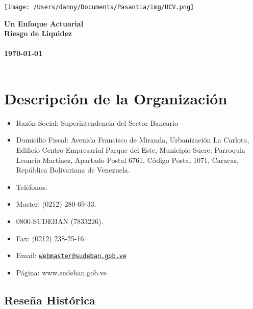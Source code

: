 \documentclass[]{article}
\title{}
\author{}
\date{}
\begin{document}
\begin{titlepage}
\pagecolor{gray40}
\noindent
\texttt{[image: /Users/danny/Documents/Pasantia/img/UCV.png]}\\[-1em]
\color{white}
\makebox[0pt][l]{\rule{1.3\textwidth}{1pt}}
\par
\noindent
\textbf{\textsf{Un Enfoque Actuarial}}\\
\Huge\textbf{Riesgo de Liquidez} \\ \\
\vfill
\noindent
\small{\textbf{\today}} \\ \\
\end{titlepage}
\restoregeometry %
\nopagecolor%

\tableofcontents

\hypertarget{descripcion-de-la-organizacion}{%
\section{Descripción de la
Organización}\label{descripcion-de-la-organizacion}}

\begin{itemize}
\item
  Razón Social: Superintendencia del Sector Bancario
\item
  Domicilio Fiscal: Avenida Francisco de Miranda, Urbanización La
  Carlota, Edificio Centro Empresarial Parque del Este, Municipio Sucre,
  Parroquia Leoncio Martínez, Apartado Postal 6761, Código Postal 1071,
  Caracas, República Bolivariana de Venezuela.
\item
  Teléfonos:
\item
  Master: (0212) 280-69-33.
\item
  0800-SUDEBAN (7833226).
\item
  Fax: (0212) 238-25-16.
\item
  Email:
  \href{mailto:webmaster@sudeban.gob.ve}{\nolinkurl{webmaster@sudeban.gob.ve}}
\item
  Página: www.sudeban.gob.ve
\end{itemize}

\hypertarget{resena-historica}{%
\subsection{Reseña Histórica}\label{resena-historica}}
\end{document}

